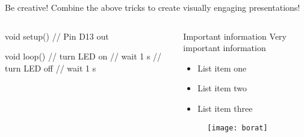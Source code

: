 \documentclass{beamer}                              %
\begin{document}
\begin{frame}[fragile]{Be creative!}
Combine the above tricks to create visually engaging presentations!
\begin{columns}[T] %
\begin{column}{.48\textwidth}
\begin{ardu}
void setup() {
     // Pin D13 out
}

void loop() {
     // turn LED on
     // wait 1 s
     // turn LED off
     // wait 1 s
}
\end{ardu}
\end{column}
\begin{column}{.48\textwidth}
\begin{block}{Important information}
Very important information
\end{block}
\begin{itemize}
\item List item one
\item List item two
\item List item three
\end{itemize}
\begin{figure}
\centering
  \texttt{[image: borat]}\\
\end{figure}
\end{column}%
\end{columns}
\end{frame}
\end{document}
